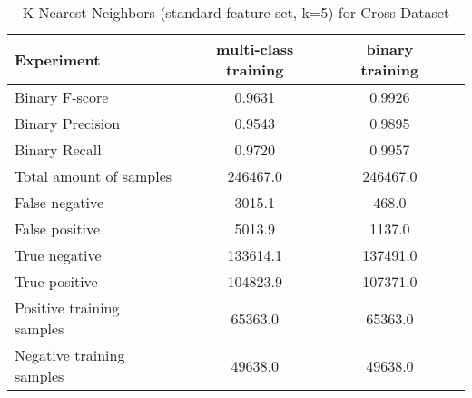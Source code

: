 \begin{table}[H]
\caption{K-Nearest Neighbors (standard feature set, k=5) for Cross Dataset}
\label{tab:bin2}
\centering
\begin{tabular}{l c c r}
\toprule
Experiment & multi-class training & binary training \\
\midrule
Binary F-score & 0.9631 & 0.9926  \\
Binary Precision & 0.9543 & 0.9895 \\
Binary Recall & 0.9720 & 0.9957 \\
\midrule
Total amount of samples & 246467.0 & 246467.0 \\
False negative & 3015.1 & 468.0  \\
False positive & 5013.9 & 1137.0  \\
True negative & 133614.1 & 137491.0  \\
True positive & 104823.9 & 107371.0  \\
\midrule
Positive training samples & 65363.0 & 65363.0 \\
Negative training samples & 49638.0 & 49638.0 \\
\bottomrule
\end{tabular}
\end{table}
